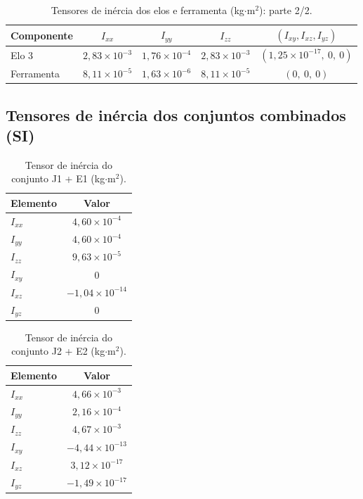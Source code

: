 \begin{table}[H]
\centering
\caption{Tensores de inércia dos elos e ferramenta (kg$\cdot$m$^2$): parte 2/2.}
\label{tab:chaser_I_elos_2_SI}
\begin{tabular}{lcccc}
\hline
\textbf{Componente} & $I_{xx}$ & $I_{yy}$ & $I_{zz}$ & $(I_{xy}, I_{xz}, I_{yz})$ \\
\hline
Elo 3 &
$2,83\times 10^{-3}$ &
$1,76\times 10^{-4}$ &
$2,83\times 10^{-3}$ &
$(1,25\times 10^{-17},\ 0,\ 0)$ \\
Ferramenta &
$8,11\times 10^{-5}$ &
$1,63\times 10^{-6}$ &
$8,11\times 10^{-5}$ &
$(0,\ 0,\ 0)$ \\
\hline
\end{tabular}
\end{table}


\subsection{Tensores de inércia dos conjuntos combinados (SI)}
\label{sec:apB_inercias_combinadas}

\begin{table}[H]
\centering
\caption{Tensor de inércia do conjunto J1 + E1 (kg$\cdot$m$^2$).}
\label{tab:B12_I_J1E1}
\begin{tabular}{lc}
\hline
\textbf{Elemento} & \textbf{Valor} \\
\hline
$I_{xx}$ & $4,60\times 10^{-4}$ \\
$I_{yy}$ & $4,60\times 10^{-4}$ \\
$I_{zz}$ & $9,63\times 10^{-5}$ \\
$I_{xy}$ & $0$ \\
$I_{xz}$ & $-1,04\times 10^{-14}$ \\
$I_{yz}$ & $0$ \\
\hline
\end{tabular}
\end{table}

\begin{table}[H]
\centering
\caption{Tensor de inércia do conjunto J2 + E2 (kg$\cdot$m$^2$).}
\label{tab:B13_I_J2E2}
\begin{tabular}{lc}
\hline
\textbf{Elemento} & \textbf{Valor} \\
\hline
$I_{xx}$ & $4,66\times 10^{-3}$ \\
$I_{yy}$ & $2,16\times 10^{-4}$ \\
$I_{zz}$ & $4,67\times 10^{-3}$ \\
$I_{xy}$ & $-4,44\times 10^{-13}$ \\
$I_{xz}$ & $3,12\times 10^{-17}$ \\
$I_{yz}$ & $-1,49\times 10^{-17}$ \\
\hline
\end{tabular}
\end{table}

